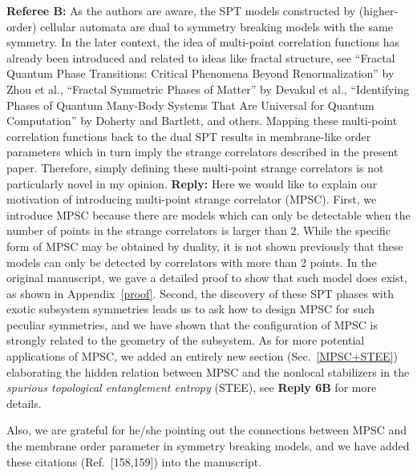 \documentclass{article}
\begin{document}
\begin{tcolorbox}[title=Reply 6A (point-to-point reply), breakable]
\textbf{Referee B:}  As the authors are aware, the SPT models constructed by
(higher-order) cellular automata are dual to symmetry breaking models
with the same symmetry. In the later context, the idea of multi-point
correlation functions has already been introduced and related to ideas
like fractal structure, see ``Fractal Quantum Phase Transitions:
Critical Phenomena Beyond Renormalization'' by Zhou et al., ``Fractal
Symmetric Phases of Matter'' by Devakul et al., ``Identifying Phases of
Quantum Many-Body Systems That Are Universal for Quantum Computation''
by Doherty and Bartlett, and others. Mapping these multi-point
correlation functions back to the dual SPT results in membrane-like
order parameters which in turn imply the strange correlators described
in the present paper. Therefore, simply defining these multi-point
strange correlators is not particularly novel in my opinion.
\tcblower
\textbf{Reply:} Here we would like to explain our motivation of introducing multi-point strange correlator (MPSC). First, we introduce MPSC because there are models which can only be detectable  when the number of points in the strange correlators is larger than 2. While the specific form of MPSC may be obtained by duality, it is not shown previously that these models can only be detected by correlators with more than 2 points. In the original manuscript, we gave a detailed proof to show that such model does exist, as shown in Appendix~\ref{proof}. Second, the discovery of these SPT phases with exotic subsystem symmetries leads us to ask how to design MPSC for such peculiar symmetries, and we have shown that the configuration of MPSC is strongly related to the geometry of the subsystem. As for more potential applications of MPSC, we added an entirely new section (Sec.~\ref{MPSC+STEE}) 
 elaborating the hidden relation between MPSC and the nonlocal stabilizers in the \textit{spurious topological entanglement entropy} (STEE), see \textbf{Reply 6B} for more details.

\bigskip
Also, we are grateful for he/she pointing out the connections between MPSC and the membrane order parameter in symmetry breaking models, and we have added these citations (Ref.~[158,159]) into the manuscript.
\end{tcolorbox}
\end{document}
